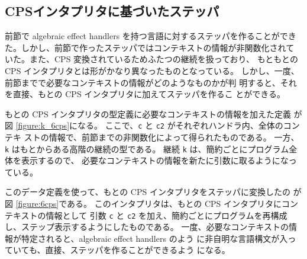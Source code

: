 \subsection{CPSインタプリタに基づいたステッパ}

前節で algebraic effect handlers を持つ言語に対するステッパを作ることができ
た。しかし、前節で作ったステッパではコンテキストの情報が非関数化されて
いた。また、CPS 変換されているためふたつの継続を扱っており、
もともとの CPS インタプリタとは形がかなり異なったものとなっている。
しかし、一度、前節までで必要なコンテキストの情報がどのようなものかが判
明すると、それを直接、もとの CPS インタプリタに加えてステッパを作るこ
とができる。

もとの CPS インタプリタの型定義に必要なコンテキストの情報を加えた定義
が図 \ref{figure:k_6cps}になる。
ここで、\texttt{c} と \texttt{c2} がそれぞれハンドラ内、全体のコンテキ
ストの情報で、前節までの非関数化によって得られたものである。
一方、\texttt{k} はもとからある高階の継続の型である。
継続 \texttt{k} は、簡約ごとにプログラム全体を表示するので、
必要なコンテキストの情報を新たに引数に取るようになっている。

このデータ定義を使って、もとの CPS インタプリタをステッパに変換したの
が図 \ref{figure:6cps}である。
このインタプリタは、もとの CPS インタプリタにコンテキストの情報として
引数 \texttt{c} と \texttt{c2} を加え、簡約ごとにプログラムを再構成
し、ステップ表示するようにしたものである。
一度、必要なコンテキストの情報が特定されると、algebraic effect handlers のよう
に非自明な言語構文が入っていても、直接、ステッパを作ることができるよう
になる。

